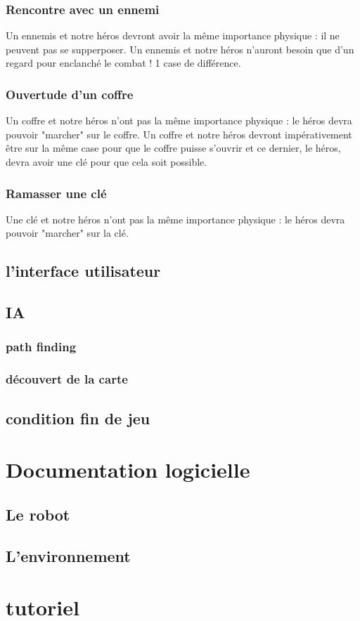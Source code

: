 \documentclass[a4paper 12pts]{article}
\begin{document}
\subsubsection {Rencontre avec un ennemi} 
Un ennemis et notre héros devront avoir la même importance physique : il ne peuvent pas se supperposer.
Un ennemis et notre héros n'auront besoin que d'un regard pour enclanché le combat ! 1 case de différence.


\subsubsection {Ouvertude d'un coffre}
Un coffre et notre héros n'ont pas la même importance physique : le héros devra pouvoir "marcher" sur le coffre.
Un coffre et notre héros devront impérativement être sur la même case pour que le coffre puisse s'ouvrir et ce dernier, 
le héros, devra avoir une clé pour que cela soit possible.


\subsubsection {Ramasser une clé}
Une clé et notre héros n'ont pas la même importance physique : le héros devra pouvoir "marcher" sur la clé.

 
\subsection{l'interface utilisateur}

\subsection{IA}

\subsubsection{path finding}

\subsubsection{découvert de la carte}

\subsection{condition fin de jeu}





\section{Documentation logicielle}



\subsection{Le robot}
\subsection{L'environnement}



\section{tutoriel}
\end{document}

